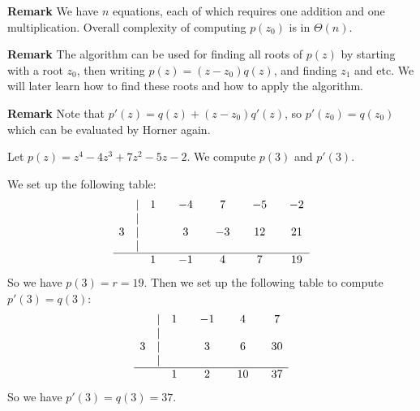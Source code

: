 \documentclass[main.tex]{subfiles}
\begin{document}
\par \noindent \textbf{Remark} We have $n$ equations, each of which requires one addition and one multiplication. Overall complexity of computing $p(z_0)$ is in $\Theta (n)$. 

\par \noindent \textbf{Remark} The algorithm can be used for finding all roots of $p(z)$ by starting with a root $z_0$, then writing $p(z) = (z - z_0)q(z)$, and finding $z_1$ and etc. We will later learn how to find these roots and how to apply the algorithm. 

\par \noindent \textbf{Remark} Note that $p'(z) = q(z) + (z - z_0)q'(z)$, so $p'(z_0) = q(z_0)$ which can be evaluated by Horner again. 
\begin{example}
    Let $p(z) = z^4 - 4z^3 + 7z^2 - 5z -2$. We compute $p(3)$ and $p'(3)$. 
\end{example}
\par We set up the following table:
\[
    \begin{array}{ccccccccccc}
        \null &  |  & 1 &     & -4 &     & 7 &     & -5 &     & -2 \\
        \null &  |  & \null &         & \null &         & \null &     & \null &     \\
        3&  |  &    &     & 3 &     & -3 &     & 12 &     & 21 \\
        \null &  |  & \null &         & \null &         & \null &     & \null &     \\
        \hline 
        \null &    &1 &     & -1&     & 4&     & 7&     & 19 \\
    \end{array}
\]
So we have $p(3) = r = 19$. Then we set up the following table to compute $p'(3) = q(3)$:
\[
    \begin{array}{ccccccccc}
        \null &  |  & 1 &     & -1 &     & 4 &     & 7 \\
        \null &  |  & \null &         & \null &         & \null &     \\
        3&  |  &    &     & 3 &     & 6 &     & 30 \\
        \null &  |  & \null &         & \null &         & \null &     \\
        \hline 
        \null &    &1 &     & 2&     & 10&     & 37 \\
    \end{array}
\]
So we have $p'(3) = q(3) = 37$.  
\end{document}
